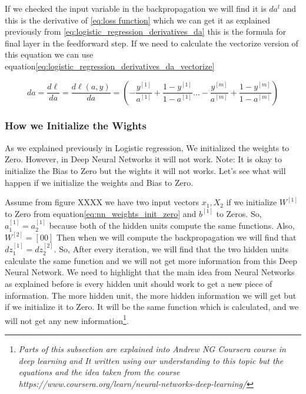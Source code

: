If we checked the input variable in the backpropagation we will find it is $da^{l}$ and this is the derivative of \eqref{eq:loss function} which we can get it as explained previously from \eqref{eq:logistic_regression_derivatives_da} this is the formula for final layer in the feedforward step. If we need to calculate the vectorize version of this equation we can use equation\eqref{eq:logistic_regression_derivatives_da_vectorize}

 \begin{equation}\label{eq:logistic_regression_derivatives_da_vectorize}
      da =  \frac{d\ell}{da} = \frac{d\ell(a,y)}{da} = (- \frac{y^{[1]}}{a^{[1]}} + \frac{1-y^{[1]}}{1-a^{[1]}} \ldots - \frac{y^{[m]}}{a^{[m]}} + \frac{1-y^{[m]}}{1-a^{[m]}} )
  \end{equation}
   
\newpage
\subsubsection{How we Initialize the Wights}

    As we explained previously in Logistic regression, We initialized the weights to Zero. However, in Deep Neural Networks it will not work. Note: It is okay to initialize the Bias to Zero but the wights it will not works. Let's see what will happen if we initialize the weights and Bias to Zero.
 
  Assume from figure XXXX we have two input vectors $x_1,X_2$ if we initialize $W^{[1]}$ to Zero from equation\eqref{eq:nn_weights_init_zero} and $b^{[1]}$ to Zeros. So, $a_1^{[1]}=a_2^{[1]}$ because both of the hidden units compute the same functions. Also, $W^{[2]}=[0 0]$ Then when we will compute the backpropagation we will find that $dz_1^{[1]}=dz_2^{[2]}$. So, After every iteration, we will find that the two hidden units calculate the same function and we will not get more information from this Deep Neural Network. We need to highlight that the main idea from Neural Networks as explained before is every hidden unit should work to get a new piece of information. The more hidden unit, the more hidden information we will get but if we initialize it to Zero. It will be the same function which is calculated, and we will not get any new information\footnote{\textit{Parts of this subsection are explained into Andrew NG Coursera course in deep learning and It written using our understanding to this topic but the equations and the idea taken from the course  https://www.coursera.org/learn/neural-networks-deep-learning/}}.

